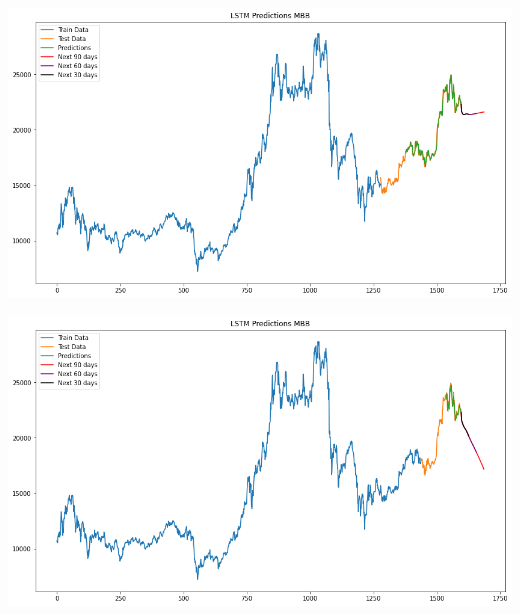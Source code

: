 \documentclass[conference]{IEEEtran}
\begin{document}
\begin{minipage}{0.21\textwidth}
    \centering
    \includegraphics[width=\linewidth]{images/LSTM/LSTM_MBB_82.png}
    \label{fig:image1}
\end{minipage}
\hfill
\begin{minipage}{0.21\textwidth}
    \centering
    \includegraphics[width=\linewidth]{images/LSTM/LSTM_MBB_91.png}
    \label{fig:image2}
\end{minipage}
\end{document}
